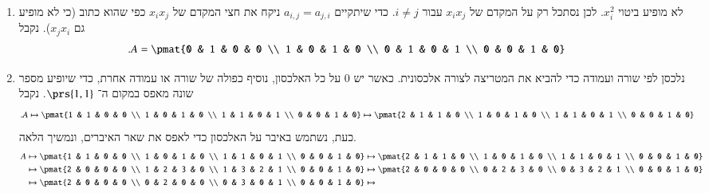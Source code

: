 \documentclass[a4paper,10pt,oneside,openany]{article}
\begin{document}
\begin{solution}
\begin{enumerate}
\item

לא מופיע ביטוי
$x_i^2$.
לכן נסתכל רק על המקדם של
$x_i x_j$
עבור
$i \neq j$.
כדי שיתקיים
$a_{i,j} = a_{j,i}$
 ניקח את חצי המקדם של
$x_i x_j$
 כפי שהוא כתוב (כי לא מופיע גם $x_j x_i$).
נקבל
\begin{align*}
\text{.} A &= \pmat{0 & 1 & 0 & 0 \\ 1 & 0 & 1 & 0 \\ 0 & 1 & 0 & 1 \\ 0 & 0 & 1 & 0}
\end{align*}

\item

נלכסן לפי שורה ועמודה כדי להביא את המטריצה לצורה אלכסונית.
כאשר יש
$0$
על כל האלכסון, נוסיף כפולה של שורה או עמודה אחרת, כדי שיופיע מספר שונה מאפס במקום ה־%
$\prs{1,1}$.
נקבל
\begin{align*}
\text{.} A &\mapsto \pmat{1 & 1 & 0 & 0 \\ 1 & 0 & 1 & 0 \\ 1 & 1 & 0 & 1 \\ 0 & 0 & 1 & 0} \mapsto
\pmat{2 & 1 & 1 & 0 \\ 1 & 0 & 1 & 0 \\ 1 & 1 & 0 & 1 \\ 0 & 0 & 1 & 0}
\end{align*}
כעת, נשתמש באיבר על האלכסון כדי לאפס את שאר האיברים, ונמשיך הלאה.
\begin{align*}
A &\mapsto \pmat{1 & 1 & 0 & 0 \\ 1 & 0 & 1 & 0 \\ 1 & 1 & 0 & 1 \\ 0 & 0 & 1 & 0} \mapsto
\pmat{2 & 1 & 1 & 0 \\ 1 & 0 & 1 & 0 \\ 1 & 1 & 0 & 1 \\ 0 & 0 & 1 & 0}
\\&\mapsto 
\pmat{2 & 0 & 0 & 0 \\ 1 & 2 & 3 & 0 \\ 1 & 3 & 2 & 1 \\ 0 & 0 & 1 & 0} \mapsto
\pmat{2 & 0 & 0 & 0 \\ 0 & 2 & 3 & 0 \\ 0 & 3 & 2 & 1 \\ 0 & 0 & 1 & 0}
\\&\mapsto
\pmat{2 & 0 & 0 & 0 \\ 0 & 2 & 0 & 0 \\ 0 & 3 & 0 & 1 \\ 0 & 0 & 1 & 0} \mapsto

\end{align*}
\end{enumerate}
\end{solution}
\end{document}
